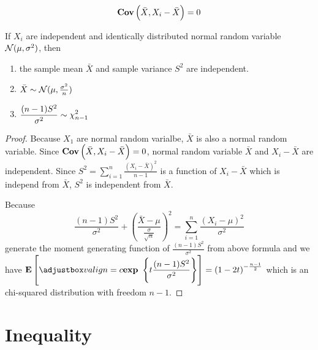\begin{theorem}
\begin{equation}
    \mathop{\bf Cov\/}\displaystyle \left(\bar{X},X_i - \bar{X} \right) = 0
\end{equation}    
\end{theorem}



\begin{theorem}
If $X_i$ are independent and identically distributed normal random variable $\mathcal{N}(\mu,\sigma^2)$, then
    \begin{enumerate}
        \item the sample mean $\bar{X}$ and sample variance $S^2$ are independent.
        \item $\bar{X} \sim \mathcal{N}(\mu,\frac{\sigma^2}{n})$
        \item $\displaystyle \frac{(n-1)S^2}{\sigma^2} \sim \chi^2_{n-1}$
    \end{enumerate}   
\end{theorem}

\begin{proof}
    Because $X_1$ are normal random varialbe, $\bar{X}$ is also a normal random variable. Since $\mathop{\bf Cov\/}\displaystyle \left(\bar{X},X_i - \bar{X} \right) = 0$, normal random variable $\bar{X}$ and $X_i - \bar{X}$ are independent. Since $S^2 = \displaystyle \sum_{i=1}^n \frac{(X_i - \bar{X})^2}{n -1}$ is a function of $X_i - \bar{X}$ which is independ from $\bar{X}$, $S^2$ is independent from $\bar{X}$.
    
    Because 
    \begin{equation*}
        \frac{(n-1)S^2}{\sigma^2} + \left(\frac{\bar{X} - \mu}{\frac{\sigma}{\sqrt{n}}}\right)^2 = \sum_{i=1}^n \frac{(X_i - \mu)^2}{\sigma^2}
    \end{equation*}
    generate the moment generating function of $\displaystyle \frac{(n-1)S^2}{\sigma^2}$ from above formula and we have $\expect{\exponential{t \frac{(n-1)S^2}{\sigma^2}}} = \left(1-2t \right)^{- \frac{n-1}{2}}$ which is an chi-squared distribution with freedom $n-1$.
\end{proof}



\section{Inequality}

